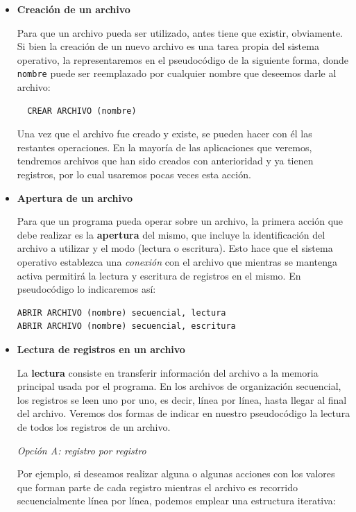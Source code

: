 \documentclass[
]{book}
\begin{document}
\begin{itemize}
\item
  \textbf{Creación de un archivo}

  Para que un archivo pueda ser utilizado, antes tiene que existir, obviamente. Si bien la creación de un nuevo archivo es una tarea propia del sistema operativo, la representaremos en el pseudocódigo de la siguiente forma, donde \texttt{nombre} puede ser reemplazado por cualquier nombre que deseemos darle al archivo:

\begin{verbatim}
  CREAR ARCHIVO (nombre)
\end{verbatim}

  Una vez que el archivo fue creado y existe, se pueden hacer con él las restantes operaciones. En la mayoría de las aplicaciones que veremos, tendremos archivos que han sido creados con anterioridad y ya tienen registros, por lo cual usaremos pocas veces esta acción.
\item
  \textbf{Apertura de un archivo}

  Para que un programa pueda operar sobre un archivo, la primera acción que debe realizar es la \textbf{apertura} del mismo, que incluye la identificación del archivo a utilizar y el modo (lectura o escritura). Esto hace que el sistema operativo establezca una \emph{conexión} con el archivo que mientras se mantenga activa permitirá la lectura y escritura de registros en el mismo. En pseudocódigo lo indicaremos así:

\begin{verbatim}
ABRIR ARCHIVO (nombre) secuencial, lectura
ABRIR ARCHIVO (nombre) secuencial, escritura
\end{verbatim}
\item
  \textbf{Lectura de registros en un archivo}

  La \textbf{lectura} consiste en transferir información del archivo a la memoria principal usada por el programa. En los archivos de organización secuencial, los registros se leen uno por uno, es decir, línea por línea, hasta llegar al final del archivo. Veremos dos formas de indicar en nuestro pseudocódigo la lectura de todos los registros de un archivo.

  \emph{Opción A: registro por registro}

  Por ejemplo, si deseamos realizar alguna o algunas acciones con los valores que forman parte de cada registro mientras el archivo es recorrido secuencialmente línea por línea, podemos emplear una estructura iterativa:


\end{itemize}
\end{document}
